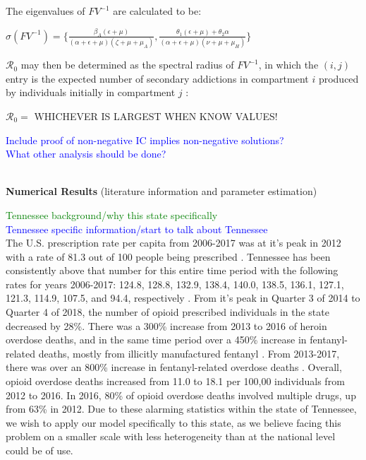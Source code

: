 \documentclass[12pt]{article}
\begin{document}
The eigenvalues of $FV^{-1}$ are calculated to be: 
\begin{center}
$\sigma (FV^{-1}) = \{ \frac{\beta_A(\epsilon+\mu)}{(\alpha+\epsilon+\mu)(\zeta+\mu+\mu_A)}, \frac{\theta_1(\epsilon+\mu)+\theta_2 \alpha}{(\alpha+\epsilon+\mu)(\nu+\mu+\mu_H)} \}$
\end{center}

$\mathscr{R}_0$ may then be determined as the spectral radius of $FV^{-1}$, in which the $(i,j)$ entry is the expected number of secondary addictions in compartment $i$ produced by individuals initially in compartment $j$ :
\begin{center}
$\mathscr{R}_0=$ WHICHEVER IS LARGEST WHEN KNOW VALUES! 
\end{center}

\textcolor{blue}{Include proof of non-negative IC implies non-negative solutions?} \\ 
\textcolor{blue}{What other analysis should be done?} \\ \\

\pagebreak

\textbf{Numerical Results} 
(literature information and parameter estimation) 
 
 \textcolor{green}{Tennessee background/why this state specifically } \\
\textcolor{blue}{Tennessee specific information/start to talk about Tennessee} \\
The U.S. prescription rate per capita from 2006-2017 was at it's peak in 2012 with a rate of 81.3 out of 100 people being prescribed \cite{CDC8}. Tennessee has been consistently above that number for this entire time period with the following rates for years 2006-2017: 124.8, 128.8, 132.9, 138.4, 140.0, 138.5, 136.1, 127.1, 121.3, 114.9, 107.5, and 94.4, respectively \cite{CDC9}. From it's peak in Quarter 3 of 2014 to Quarter 4 of 2018, the number of opioid prescribed individuals in the state decreased by 28\%. There was a 300\% increase from 2013 to 2016 of heroin overdose deaths, and in the same time period over a 450\% increase in fentanyl-related deaths, mostly from illicitly manufactured fentanyl \cite{PDO}. From 2013-2017, there was over an 800\% increase in fentanyl-related overdose deaths \cite{PDO2}. Overall, opioid overdose deaths increased from 11.0 to 18.1 per 100,00 individuals from 2012 to 2016. In 2016, 80\% of opioid overdose deaths involved multiple drugs, up from 63\% in 2012. Due to these alarming statistics within the state of Tennessee, we wish to apply our model specifically to this state, as we believe facing this problem on a smaller scale with less heterogeneity than at the national level could be of use. 
\end{document}

